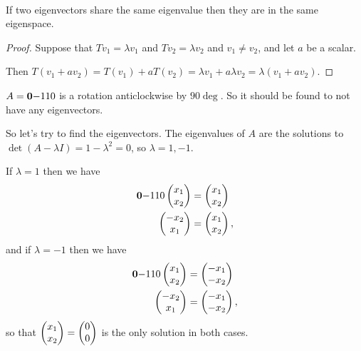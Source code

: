 \begin{remark*}~\\
  If two eigenvectors share the same eigenvalue then they are in the same eigenspace.
\end{remark*}

\begin{proof}
  Suppose that $Tv_1 = \lambda v_1$ and $Tv_2 = \lambda v_2$ and
  $v_1 \neq v_2$, and let $a$ be a scalar.

  Then
  $T(v_1 + av_2) = T(v_1) + aT(v_2) = \lambda v_1 + a\lambda v_2 = \lambda(v_1
  + av_2)$.
\end{proof}



\begin{example*}
  $A = \mathbf
  {0}{-1}
  {1}{0}$ is a rotation anticlockwise by $90\deg$. So it should be found to not
  have any eigenvectors.

  So let's try to find the eigenvectors. The eigenvalues of $A$ are the solutions to
  $\det (A - \lambda I) = 1 -\lambda^2 = 0$, so $\lambda = 1, -1$.

  If $\lambda = 1$ then we have
  \begin{align*}
    \mathbf{0}{-1}{1}{0}\begin{pmatrix}x_1\\x_2\end{pmatrix} &= \begin{pmatrix}x_1\\x_2\end{pmatrix} \\
    \begin{pmatrix}-x_2\\x_1\end{pmatrix} &= \begin{pmatrix}x_1\\x_2\end{pmatrix},
  \end{align*}
  and if $\lambda = -1$ then we have
  \begin{align*}
    \mathbf{0}{-1}{1}{0}\begin{pmatrix}x_1\\x_2\end{pmatrix} &= \begin{pmatrix}-x_1\\-x_2\end{pmatrix} \\
    \begin{pmatrix}-x_2\\x_1\end{pmatrix} &= \begin{pmatrix}-x_1\\-x_2\end{pmatrix},
  \end{align*}
  so that $\begin{pmatrix}x_1\\x_2\end{pmatrix} = \begin{pmatrix}0\\0\end{pmatrix}$ is the only solution in both cases.
\end{example*}

